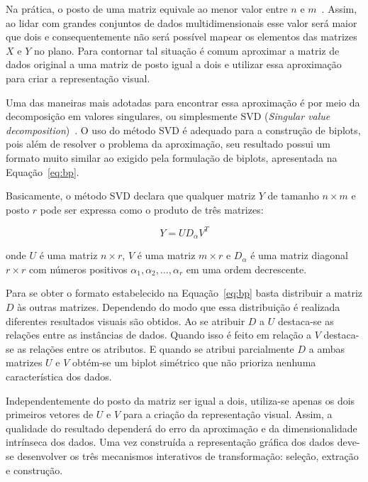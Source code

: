 Na prática, o posto de uma matriz equivale ao menor valor
entre $n$ e $m$~\cite{Greenacre2010}. Assim, ao lidar com
grandes conjuntos de dados multidimensionais esse valor será
maior que dois e consequentemente não será possível mapear
os elementos das matrizes $X$ e $Y$ no plano. Para contornar
tal situação é comum aproximar a matriz de dados original a
uma matriz de posto igual a dois e utilizar essa aproximação
para criar a representação visual.

Uma das maneiras mais adotadas para encontrar essa
aproximação é por meio da decomposição em valores
singulares, ou simplesmente SVD (\emph{Singular value
decomposition})~\cite{Kalman1996}. O uso do método SVD é
adequado para a construção de biplots, pois além de
resolver o problema da aproximação, seu resultado possui
um formato muito similar ao exigido pela formulação de biplots,
apresentada na Equação~\ref{eq:bp}.

Basicamente, o método SVD declara que qualquer matriz $Y$
de tamanho $n \times m$ e posto $r$ pode ser expressa como o
produto de três matrizes:

\begin{equation}
    Y = UD_{\alpha}V^T
\end{equation}

onde $U$ é uma matriz $n \times r$, $V$ é uma matriz $m
\times r$ e $D_\alpha$ é uma matriz diagonal $r \times r$
com números positivos $\alpha_1,\alpha_2,\ldots,\alpha_r$ em
uma ordem decrescente. 

Para se obter o formato estabelecido na Equação~\ref{eq:bp}
basta distribuir a matriz $D$ às outras matrizes. Dependendo
do modo que essa distribuição é realizada diferentes
resultados visuais são obtidos. Ao se atribuir $D$ a $U$
destaca-se as relações entre as instâncias de dados. Quando
isso é feito em relação a $V$ destaca-se as relações entre
os atributos. E quando se atribui parcialmente $D$ a ambas
matrizes $U$ e $V$ obtém-se um biplot simétrico que não
prioriza nenhuma característica dos dados.

Independentemente do posto da matriz ser igual a dois,
utiliza-se apenas os dois primeiros vetores de $U$ e $V$
para a criação da representação visual. Assim, a qualidade
do resultado dependerá do erro da aproximação e da
dimensionalidade intrínseca dos dados. Uma vez construída a
representação gráfica dos dados deve-se desenvolver os três
mecanismos interativos de transformação: seleção, extração e
construção.

